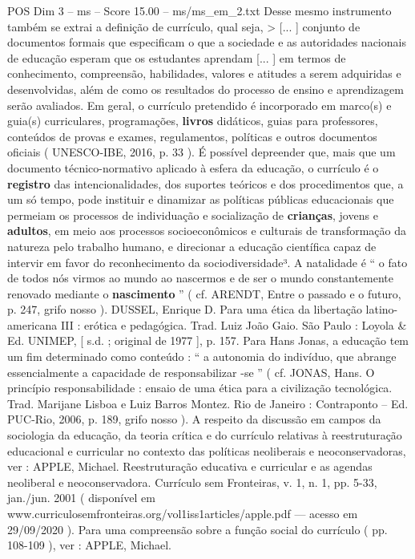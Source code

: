 \begin{textsample}{POS Dim 3 – ms – Score 15.00 – ms/ms\_em\_2.txt}
Desse mesmo instrumento também se extrai a definição de currículo, qual seja, > [... ] conjunto de documentos formais que especificam o que a sociedade e as autoridades nacionais de educação esperam que os estudantes aprendam [... ] em termos de conhecimento, compreensão, habilidades, valores e atitudes a serem adquiridas e desenvolvidas, além de como os resultados do processo de ensino e aprendizagem serão avaliados.
Em geral, o currículo pretendido é incorporado em marco(s) e guia(s) curriculares, programações, \textbf{livros} didáticos, guias para professores, conteúdos de provas e exames, regulamentos, políticas e outros documentos oficiais ( UNESCO-IBE, 2016, p. 33 ).
É possível depreender que, mais que um documento técnico-normativo aplicado à esfera da educação, o currículo é o \textbf{registro} das intencionalidades, dos suportes teóricos e dos procedimentos que, a um só tempo, pode instituir e dinamizar as políticas públicas educacionais que permeiam os processos de individuação e socialização de \textbf{crianças}, jovens e \textbf{adultos}, em meio aos processos socioeconômicos e culturais de transformação da natureza pelo trabalho humano, e direcionar a educação científica capaz de intervir em favor do reconhecimento da sociodiversidade³.
A natalidade é “ o fato de todos nós virmos ao mundo ao nascermos e de ser o mundo constantemente renovado mediante o \textbf{nascimento} ” ( cf.
ARENDT, Entre o passado e o futuro, p. 247, grifo nosso ).
DUSSEL, Enrique D.
Para uma ética da libertação latino-americana III : erótica e pedagógica.
Trad.
Luiz João Gaio.
São Paulo : Loyola \& Ed.
UNIMEP, [ s.d. ; original de 1977 ], p. 157.
Para Hans Jonas, a educação tem um fim determinado como conteúdo : “ a autonomia do indivíduo, que abrange essencialmente a capacidade de responsabilizar -se ” ( cf.
JONAS, Hans.
O princípio responsabilidade : ensaio de uma ética para a civilização tecnológica.
Trad.
Marijane Lisboa e Luiz Barros Montez.
Rio de Janeiro : Contraponto – Ed.
PUC-Rio, 2006, p. 189, grifo nosso ).
A respeito da discussão em campos da sociologia da educação, da teoria crítica e do currículo relativas à reestruturação educacional e curricular no contexto das políticas neoliberais e neoconservadoras, ver : APPLE, Michael.
Reestruturação educativa e curricular e as agendas neoliberal e neoconservadora.
Currículo sem Fronteiras, v. 1, n. 1, pp. 5-33, jan./jun. 2001 ( disponível em www.curriculosemfronteiras.org/vol1iss1articles/apple.pdf — acesso em 29/09/2020 ).
Para uma compreensão sobre a função social do currículo ( pp. 108-109 ), ver : APPLE, Michael.

\end{textsample}
